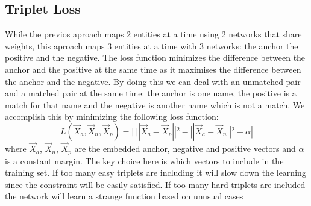 \subsection{Triplet Loss}
While the previos aproach maps 2 entities at a time using 2 networks that share weights, this aproach maps 3 entities at a time with 3 networks: the anchor the positive and the negative. The loss function minimizes the difference between the anchor and the positive at the same time as it maximises the difference between the anchor and the negative. By doing this we can deal with an unmatched pair and a matched pair at the same time: the anchor is one name, the positive is a match for that name and the negative is another name which is not a match.\cite{schroff2015facenet} We accomplish this by minimizing the following loss function: \[ L(\vec{X}_a, \vec{X}_n, \vec{X}_p) = |\:||\vec{X}_a - \vec{X}_p||^2 - ||\vec{X}_a - \vec{X}_n||^2 + \alpha|\] where $\vec{X}_a$, $\vec{X}_n$, $\vec{X}_p$ are the embedded anchor, negative and positive vectors and $\alpha$ is a constant margin. The key choice here is which vectors to include in the training set. If too many easy triplets are including it will slow down the learning since the constraint will be easily satisfied. If too many hard triplets are included the network will learn a strange function based on unusual cases 
